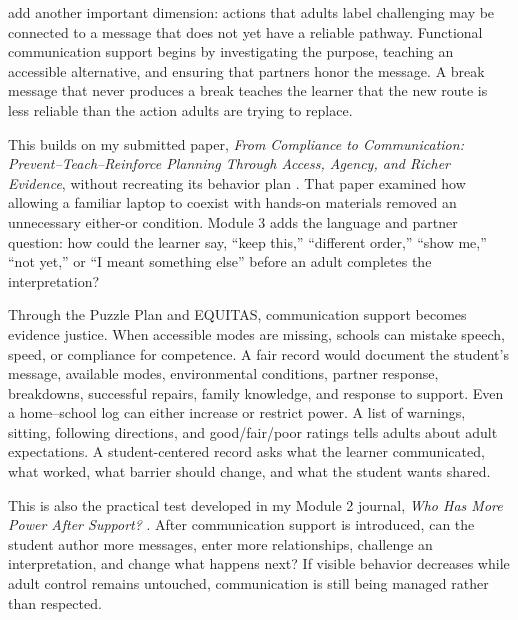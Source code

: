 
\citet{peckhamhardin2015behavior} add another important dimension: actions that adults label challenging may be connected to a message that does not yet have a reliable pathway. Functional communication support begins by investigating the purpose, teaching an accessible alternative, and ensuring that partners honor the message. A break message that never produces a break teaches the learner that the new route is less reliable than the action adults are trying to replace.

This builds on my submitted paper, \textit{From Compliance to Communication: Prevent--Teach--Reinforce Planning Through Access, Agency, and Richer Evidence}, without recreating its behavior plan \citep{garciabautista2026ptr}. That paper examined how allowing a familiar laptop to coexist with hands-on materials removed an unnecessary either-or condition. Module 3 adds the language and partner question: how could the learner say, ``keep this,'' ``different order,'' ``show me,'' ``not yet,'' or ``I meant something else'' before an adult completes the interpretation?

Through the Puzzle Plan and EQUITAS, communication support becomes evidence justice. When accessible modes are missing, schools can mistake speech, speed, or compliance for competence. A fair record would document the student's message, available modes, environmental conditions, partner response, breakdowns, successful repairs, family knowledge, and response to support. Even a home--school log can either increase or restrict power. A list of warnings, sitting, following directions, and good/fair/poor ratings tells adults about adult expectations. A student-centered record asks what the learner communicated, what worked, what barrier should change, and what the student wants shared.

This is also the practical test developed in my Module 2 journal, \textit{Who Has More Power After Support?} \citep{garciabautista2026module2journal}. After communication support is introduced, can the student author more messages, enter more relationships, challenge an interpretation, and change what happens next? If visible behavior decreases while adult control remains untouched, communication is still being managed rather than respected.

